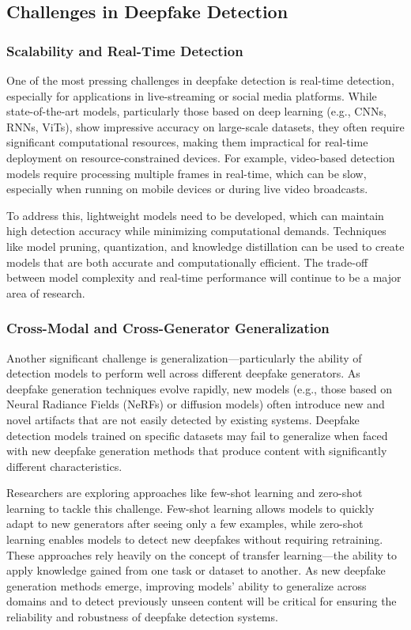 \documentclass[lettersize,journal]{IEEEtran}
\begin{document}
\subsection{Challenges in Deepfake Detection}

\subsubsection{Scalability and Real-Time Detection}
One of the most pressing challenges in deepfake detection is real-time detection, especially for applications in live-streaming or social media platforms. While state-of-the-art models, particularly those based on deep learning (e.g., CNNs, RNNs, ViTs), show impressive accuracy on large-scale datasets, they often require significant computational resources, making them impractical for real-time deployment on resource-constrained devices. For example, video-based detection models require processing multiple frames in real-time, which can be slow, especially when running on mobile devices or during live video broadcasts.

To address this, lightweight models need to be developed, which can maintain high detection accuracy while minimizing computational demands. Techniques like model pruning, quantization, and knowledge distillation can be used to create models that are both accurate and computationally efficient. The trade-off between model complexity and real-time performance will continue to be a major area of research.\cite{narne2024advanced}

\subsubsection{Cross-Modal and Cross-Generator Generalization}
Another significant challenge is generalization—particularly the ability of detection models to perform well across different deepfake generators. As deepfake generation techniques evolve rapidly, new models (e.g., those based on Neural Radiance Fields (NeRFs) or diffusion models) often introduce new and novel artifacts that are not easily detected by existing systems. Deepfake detection models trained on specific datasets may fail to generalize when faced with new deepfake generation methods that produce content with significantly different characteristics.

Researchers are exploring approaches like few-shot learning and zero-shot learning to tackle this challenge. Few-shot learning allows models to quickly adapt to new generators after seeing only a few examples, while zero-shot learning enables models to detect new deepfakes without requiring retraining. These approaches rely heavily on the concept of transfer learning—the ability to apply knowledge gained from one task or dataset to another. As new deepfake generation methods emerge, improving models’ ability to generalize across domains and to detect previously unseen content will be critical for ensuring the reliability and robustness of deepfake detection systems.\cite{srinivasan2025deepfake}
\end{document}
